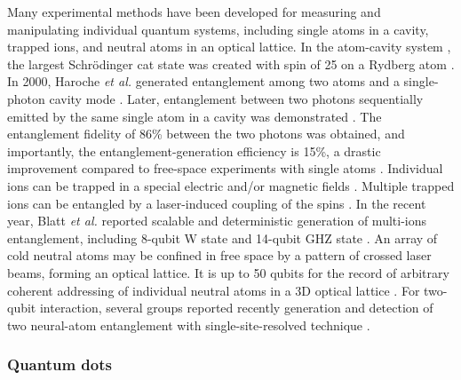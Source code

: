 \documentclass[aps, rmp, twocolumn, amsmath, amssymb, nofootinbib, superscriptaddress, longbibliography, floatfix, table-of-contents, eqsecnum]{revtex4-1}
\begin{document}
Many experimental methods have been developed for measuring and manipulating individual quantum systems, including single atoms in a cavity, trapped ions, and neutral atoms in an optical lattice. In the atom-cavity system \cite{haroche2006exploring}, the largest Schr{\"o}dinger cat state was created with spin of 25 on a Rydberg atom \cite{facon2016sensitive}. In 2000, Haroche \textit{et al.} generated entanglement among two atoms and a single-photon cavity mode \cite{rauschenbeutel2000step}. Later, entanglement between two photons sequentially emitted by the same single atom in a cavity was demonstrated \cite{wilk2007single}. The entanglement fidelity of 86\% between the two photons was obtained, and importantly, the entanglement-generation efficiency is 15\%, a drastic improvement compared to free-space experiments with single atoms \cite{blinov2004observation}. Individual ions can be trapped in a special electric and/or magnetic fields \cite{leibfried2003quantum}. Multiple trapped ions can be entangled by a laser-induced coupling of the spins \cite{blatt2008entangled}. In the recent year, Blatt \textit{et al.} reported scalable and deterministic generation of multi-ions entanglement, including 8-qubit W state \cite{haffner2005scalable} and 14-qubit GHZ state \cite{monz2011}. An array of cold neutral atoms may be confined in free space by a pattern of crossed laser beams, forming an optical lattice. It is up to 50 qubits for the record of arbitrary coherent addressing of individual neutral atoms in a 3D optical lattice \cite{wang2015coherent}. For two-qubit interaction, several groups reported recently generation and detection of two neural-atom entanglement with single-site-resolved technique \cite{kaufman2015entangling, islam2015measuring, dai2016generation}.

%
%

\subsubsection{Quantum dots} 
\end{document}
